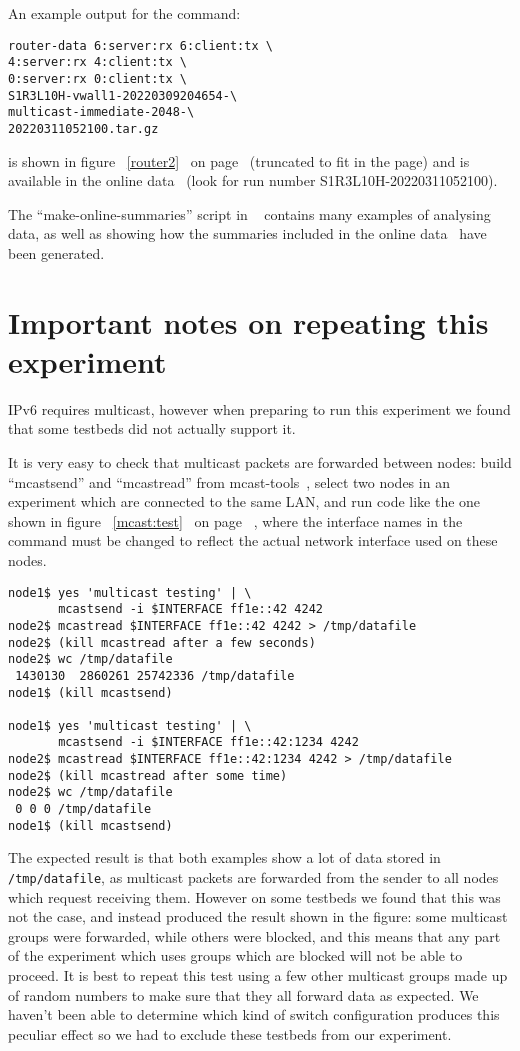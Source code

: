\documentclass[a4paper,11pt,twocolumn]{article}
\newcommand{\pref}[1]{%
\ref{#1}%
\ifnum\thepage=0\pageref{#1}\else\ on page~\pageref{#1}\fi%
}
\begin{document}
An example output for the command:

\begin{verbatim}
router-data 6:server:rx 6:client:tx \
4:server:rx 4:client:tx \
0:server:rx 0:client:tx \
S1R3L10H-vwall1-20220309204654-\
multicast-immediate-2048-\
20220311052100.tar.gz
\end{verbatim}

\noindent
is shown in figure~\pref{router2} (truncated to fit in the page) and
is available in the online data~\cite{data} (look for run number
S1R3L10H-20220311052100).

The ``make-online-summaries'' script in ~\cite{exp:scripts} contains many
examples of analysing data, as well as showing how the summaries included
in the online data~\cite{data} have been generated.

\section{Important notes on repeating this experiment}
\label{configuration}
IPv6 requires multicast, however when preparing to run this experiment
we found that some testbeds did not actually support it.

It is very easy to check that multicast packets are forwarded between nodes:
build ``mcastsend'' and ``mcastread'' from mcast-tools~\cite{mcast-tools},
select two nodes in an experiment which are connected to the same LAN,
and run code like the one shown in figure~\pref{mcast:test}, where the
interface names in the command must be changed to reflect the actual
network interface used on these nodes.
\begin{figure*}[tbp]
\begin{verbatim}
node1$ yes 'multicast testing' | \
       mcastsend -i $INTERFACE ff1e::42 4242
node2$ mcastread $INTERFACE ff1e::42 4242 > /tmp/datafile
node2$ (kill mcastread after a few seconds)
node2$ wc /tmp/datafile
 1430130  2860261 25742336 /tmp/datafile
node1$ (kill mcastsend)

node1$ yes 'multicast testing' | \
       mcastsend -i $INTERFACE ff1e::42:1234 4242
node2$ mcastread $INTERFACE ff1e::42:1234 4242 > /tmp/datafile
node2$ (kill mcastread after some time)
node2$ wc /tmp/datafile
 0 0 0 /tmp/datafile
node1$ (kill mcastsend)
\end{verbatim}
\caption{Testing proper switch configuration (also see text)}
\label{mcast:test}
\end{figure*}

The expected result is that both examples show a lot of data stored in
{\tt/tmp/datafile}, as multicast packets are forwarded from the sender
to all nodes which request receiving them.  However on some testbeds we
found that this was not the case, and instead produced the result shown
in the figure: some multicast groups were forwarded, while others were
blocked, and this means that any part of the experiment which uses groups
which are blocked will not be able to proceed. It is best to repeat this
test using a few other multicast groups made up of random numbers to
make sure that they all forward data as expected.  We haven't been able
to determine which kind of switch configuration produces this peculiar
effect so we had to exclude these testbeds from our experiment.
\end{document}

